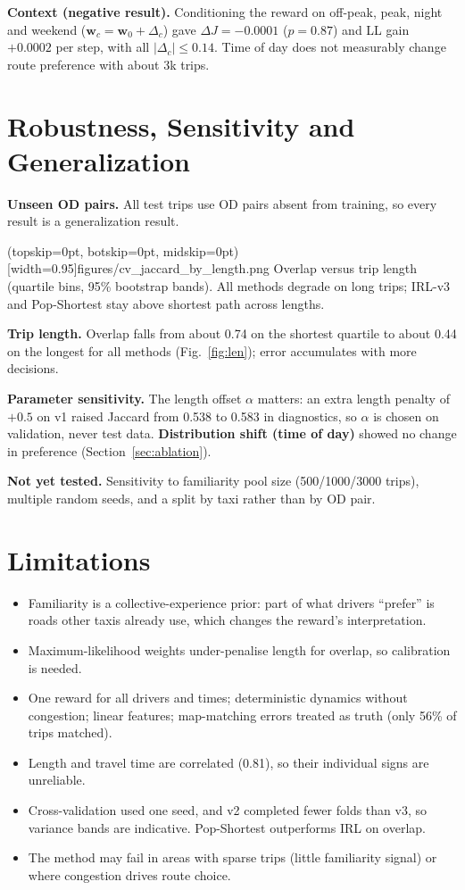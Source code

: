 \documentclass{ieeeaccess}
\newcommand{\bw}{\mathbf{w}}
\begin{document}
\textbf{Context (negative result).} Conditioning the reward on off-peak, peak, night and weekend ($\bw_c=\bw_0+\Delta_c$) gave $\Delta J=-0.0001$ ($p=0.87$) and LL gain $+0.0002$ per step, with all $|\Delta_c|\le0.14$. Time of day does not measurably change route preference with about 3k trips.

\section{Robustness, Sensitivity and Generalization}\label{sec:robust}
\textbf{Unseen OD pairs.} All test trips use OD pairs absent from training, so every result is a generalization result.

\Figure[t!](topskip=0pt, botskip=0pt, midskip=0pt)[width=0.95\columnwidth]{figures/cv_jaccard_by_length.png}
{Overlap versus trip length (quartile bins, 95\% bootstrap bands). All methods degrade on long trips; IRL-v3 and Pop-Shortest stay above shortest path across lengths.\label{fig:len}}

\textbf{Trip length.} Overlap falls from about 0.74 on the shortest quartile to about 0.44 on the longest for all methods (Fig.~\ref{fig:len}); error accumulates with more decisions.

\textbf{Parameter sensitivity.} The length offset $\alpha$ matters: an extra length penalty of $+0.5$ on v1 raised Jaccard from 0.538 to 0.583 in diagnostics, so $\alpha$ is chosen on validation, never test data. \textbf{Distribution shift (time of day)} showed no change in preference (Section~\ref{sec:ablation}).

\textbf{Not yet tested.} Sensitivity to familiarity pool size (500/1000/3000 trips), multiple random seeds, and a split by taxi rather than by OD pair.

\section{Limitations}\label{sec:limits}
\begin{itemize}
\item Familiarity is a collective-experience prior: part of what drivers ``prefer'' is roads other taxis already use, which changes the reward's interpretation.
\item Maximum-likelihood weights under-penalise length for overlap, so calibration is needed.
\item One reward for all drivers and times; deterministic dynamics without congestion; linear features; map-matching errors treated as truth (only 56\% of trips matched).
\item Length and travel time are correlated (0.81), so their individual signs are unreliable.
\item Cross-validation used one seed, and v2 completed fewer folds than v3, so variance bands are indicative. Pop-Shortest outperforms IRL on overlap.
\item The method may fail in areas with sparse trips (little familiarity signal) or where congestion drives route choice.
\end{itemize}
\end{document}
